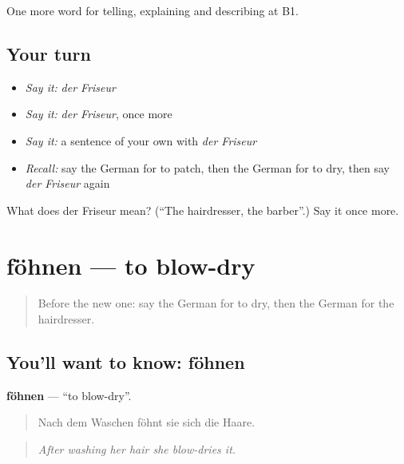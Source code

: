 \begin{grammarlens}[title={What you've built}]
One more word for telling, explaining and describing at B1.
\end{grammarlens}

\subsection*{Your turn}
\begin{itemize}
\raggedright
  \item \emph{Say it:} \emph{der Friseur}
  \item \emph{Say it:} \emph{der Friseur}, once more
  \item \emph{Say it:} a sentence of your own with \emph{der Friseur}
  \item \emph{Recall:} say the German for to patch, then the German for to dry, then say \emph{der Friseur} again
\end{itemize}

\begin{tcolorbox}[breakable,colback=teal!4,colframe=teal!35!black,title={Before you move on}]
What does der Friseur mean? (\textquotedblleft{}The hairdresser, the barber\textquotedblright{}.) Say it once more.
\end{tcolorbox}
\section[föhnen]{föhnen — to blow-dry}

\label{lesson:GE-C447-foehnen}



\begin{quote}
Before the new one: say the German for to dry, then the German for the hairdresser.
\end{quote}

\subsection*{You'll want to know: föhnen}
\textbf{föhnen} — \textquotedblleft{}to blow-dry\textquotedblright{}.

\begin{quote}
Nach dem Waschen föhnt sie sich die Haare.
\end{quote}

\begin{quote}
\emph{After washing her hair she blow-dries it.}
\end{quote}

